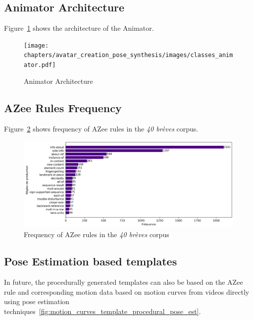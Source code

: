 \documentclass[../main.tex]{subfiles}
\begin{document}
\subsection{Animator Architecture}
\label{annex:avatar_creation_pose_synthesis:animator_architecture}

Figure~\ref{fig:animator_architecture} shows the architecture of the Animator.

\begin{figure}
    \centering
    \texttt{[image: chapters/avatar\_creation\_pose\_synthesis/images/classes\_animator.pdf]}
    \caption{Animator Architecture}
    \label{fig:animator_architecture}
\end{figure}


\subsection{AZee Rules Frequency}
\label{annex:intermediate_blocks_pose_correction:azee_rules_frequency}

Figure~\ref{fig:azee_rule_frequency_ch1} shows frequency of AZee rules in the \emph{40 brèves} corpus.

\begin{figure}[h]
    \centering
    \includegraphics[width=5in]{chapters/intermediate_blocks_pose_correction/images/azee_rule_frequency.png}
    \caption{Frequency of AZee rules in the \emph{40 brèves} corpus}
    \label{fig:azee_rule_frequency_ch1}
\end{figure}

\subsection{Pose Estimation based templates}
\label{annex:intermediate_blocks_pose_correction:pose_est_templates}

In future, the procedurally generated templates can also be based on the AZee rule and corresponding motion data based on motion curves from videos directly using pose estimation techniques~\ref{fig:motion_curves_template_procedural_pose_est}.
\end{document}
